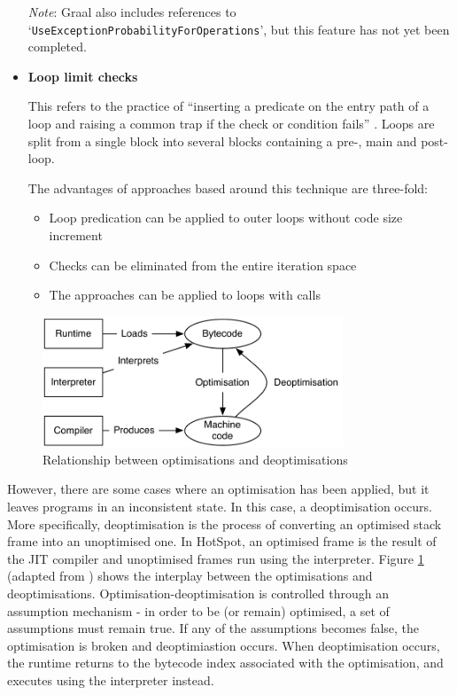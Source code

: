 \begin{itemize}
		{\small\textit{Note}: Graal also includes references to `\texttt{UseExceptionProbabilityForOperations}', but this feature has not yet been completed.}
	
	\item \textbf{Loop limit checks}
	
		This refers to the practice of ``inserting a predicate on the entry path of a loop and raising a common trap if the check or condition fails'' \citep{LoopPrediction}. Loops are split from a single block into several blocks containing a pre-, main and post- loop.
		
		The advantages of approaches based around this technique are three-fold:
		
		\begin{itemize}
			\item Loop predication can be applied to outer loops without code size increment
			
			\item Checks can be eliminated from the entire iteration space
			
			\item The approaches can be applied to loops with calls
		\end{itemize}
\end{itemize}

\begin{figure}
	\centering
	\includegraphics[width=0.8\textwidth]{graphics/jvminternals.pdf}
	\caption{Relationship between optimisations and deoptimisations}
	\label{fig:jvm-internals}
\end{figure}

However, there are some cases where an optimisation has been applied, but it leaves programs in an inconsistent state. In this case, a deoptimisation occurs. More specifically, deoptimisation \citep{Holzle1992} is the process of converting an optimised stack frame into an unoptimised one. In HotSpot, an optimised frame is the result of the JIT compiler and unoptimised frames run using the interpreter. Figure \ref{fig:jvm-internals} (adapted from \citet[p.~24]{Schwaighofer2009}) shows the interplay between the optimisations and deoptimisations. Optimisation-deoptimisation is controlled through an assumption mechanism - in order to be (or remain) optimised, a set of assumptions must remain true. If any of the assumptions becomes false, the optimisation is broken and deoptimiastion occurs. When deoptimisation occurs, the runtime returns to the bytecode index associated with the optimisation, and executes using the interpreter instead.

